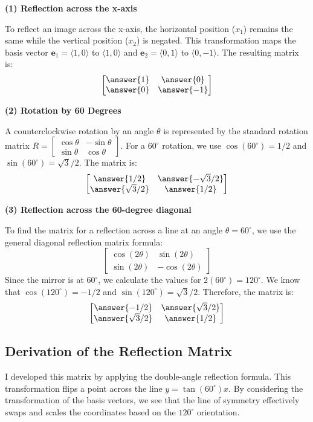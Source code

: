 \documentclass{ximera}
\begin{document}
\textbf{(1) Reflection across the x-axis}

To reflect an image across the x-axis, the horizontal position ($x_1$) remains the same while the vertical position ($x_2$) is negated. This transformation maps the basis vector $\mathbf{e}_1 = \langle 1,0 \rangle$ to $\langle 1,0 \rangle$ and $\mathbf{e}_2 = \langle 0,1 \rangle$ to $\langle 0,-1 \rangle$. The resulting matrix is:
\[
\begin{bmatrix}
\answer{1} & \answer{0} \\
\answer{0} & \answer{-1}
\end{bmatrix}
\]

\textbf{(2) Rotation by 60 Degrees}

A counterclockwise rotation by an angle $\theta$ is represented by the standard rotation matrix $R = \begin{bmatrix} \cos\theta & -\sin\theta \\ \sin\theta & \cos\theta \end{bmatrix}$. For a $60^\circ$ rotation, we use $\cos(60^\circ) = 1/2$ and $\sin(60^\circ) = \sqrt{3}/2$. The matrix is:
\[
\begin{bmatrix}
\answer{1/2} & \answer{-\sqrt{3}/2} \\
\answer{\sqrt{3}/2} & \answer{1/2}
\end{bmatrix}
\]

\textbf{(3) Reflection across the 60-degree diagonal}

To find the matrix for a reflection across a line at an angle $\theta = 60^\circ$, we use the general diagonal reflection matrix formula:
\[
\begin{bmatrix} \cos(2\theta) & \sin(2\theta) \\ \sin(2\theta) & -\cos(2\theta) \end{bmatrix}
\]
Since the mirror is at $60^\circ$, we calculate the values for $2(60^\circ) = 120^\circ$. We know that $\cos(120^\circ) = -1/2$ and $\sin(120^\circ) = \sqrt{3}/2$. Therefore, the matrix is:
\[
\begin{bmatrix}
\answer{-1/2} & \answer{\sqrt{3}/2} \\
\answer{\sqrt{3}/2} & \answer{1/2}
\end{bmatrix}
\]

\subsection*{Derivation of the Reflection Matrix}
I developed this matrix by applying the double-angle reflection formula. This transformation flips a point across the line $y = \tan(60^\circ)x$. By considering the transformation of the basis vectors, we see that the line of symmetry effectively swaps and scales the coordinates based on the $120^\circ$ orientation.
\end{document}
